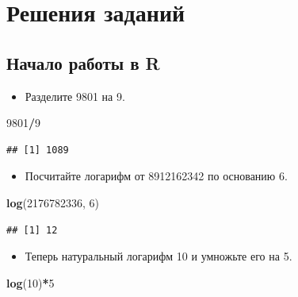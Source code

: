 \documentclass[]{book}
\newenvironment{Shaded}{\begin{snugshade}}{\end{snugshade}}
\newcommand{\KeywordTok}[1]{\textcolor[rgb]{0.13,0.29,0.53}{\textbf{#1}}}
\newcommand{\DecValTok}[1]{\textcolor[rgb]{0.00,0.00,0.81}{#1}}
\newcommand{\OperatorTok}[1]{\textcolor[rgb]{0.81,0.36,0.00}{\textbf{#1}}}
\newcommand{\NormalTok}[1]{#1}
\providecommand{\tightlist}{%
  \setlength{\itemsep}{0pt}\setlength{\parskip}{0pt}}
\begin{document}
\chapter{Решения заданий}\label{solutions}

\section{Начало работы в R}\label{solution_begin}

\begin{itemize}
\tightlist
\item
  Разделите 9801 на 9.
\end{itemize}

\begin{Shaded}
\begin{Highlighting}[]
\DecValTok{9801}\OperatorTok{/}\DecValTok{9}
\end{Highlighting}
\end{Shaded}

\begin{verbatim}
## [1] 1089
\end{verbatim}

\begin{itemize}
\tightlist
\item
  Посчитайте логарифм от 8912162342 по основанию 6.
\end{itemize}

\begin{Shaded}
\begin{Highlighting}[]
\KeywordTok{log}\NormalTok{(}\DecValTok{2176782336}\NormalTok{, }\DecValTok{6}\NormalTok{)}
\end{Highlighting}
\end{Shaded}

\begin{verbatim}
## [1] 12
\end{verbatim}

\begin{itemize}
\tightlist
\item
  Теперь натуральный логарифм 10 и умножьте его на 5.
\end{itemize}

\begin{Shaded}
\begin{Highlighting}[]
\KeywordTok{log}\NormalTok{(}\DecValTok{10}\NormalTok{)}\OperatorTok{*}\DecValTok{5}
\end{Highlighting}
\end{Shaded}
\end{document}
